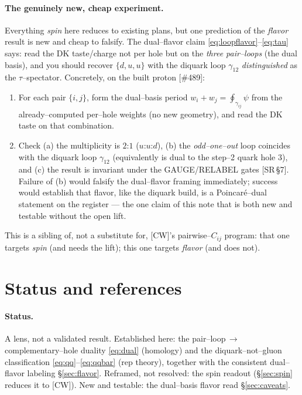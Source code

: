 \documentclass[11pt,oneside]{article}
\theoremstyle{plain}
\begin{document}
\paragraph{The genuinely new, cheap experiment.}
Everything \emph{spin} here reduces to existing plans, but one prediction of the
\emph{flavor} result is new and cheap to falsify. The dual--flavor claim
\eqref{eq:loopflavor}--\eqref{eq:tau} says: read the DK taste/charge not per hole
but on the \emph{three pair--loops} (the dual basis), and you should recover
$\{d,u,u\}$ with the diquark loop $\gamma_{12}$ \emph{distinguished} as the
$\tau$--spectator. Concretely, on the built proton [\#489]:
\begin{enumerate}[leftmargin=1.9em]
  \item For each pair $\{i,j\}$, form the dual--basis period
        $w_i+w_j=\oint_{\gamma_{ij}}\psi$ from the already--computed per--hole
        weights (no new geometry), and read the DK taste on that combination.
  \item Check (a) the multiplicity is $2$:$1$ ($u$:$u$:$d$), (b) the
        \emph{odd--one--out} loop coincides with the diquark loop $\gamma_{12}$
        (equivalently is dual to the step--2 quark hole $3$), and (c) the result is
        invariant under the GAUGE/RELABEL gates [SR\,\S7]. Failure of (b) would
        falsify the dual--flavor framing immediately; success would establish that
        flavor, like the diquark build, is a Poincar\'e--dual statement on the
        register --- the one claim of this note that is both new and testable
        without the open lift.
\end{enumerate}
This is a sibling of, not a substitute for, [CW]'s pairwise--$C_{ij}$ program: that
one targets \emph{spin} (and needs the lift); this one targets \emph{flavor} (and
does not).

\section{Status and references}
\label{sec:status}

\paragraph{Status.} A lens, not a validated result. Established here: the
pair--loop$\,\to\,$complementary--hole duality \eqref{eq:dual} (homology) and the
diquark--not--gluon classification \eqref{eq:qq}--\eqref{eq:qqbar} (rep theory),
together with the consistent dual--flavor labeling \S\ref{sec:flavor}. Reframed,
not resolved: the spin readout (\S\ref{sec:spin} reduces it to [CW]). New and
testable: the dual--basis flavor read \S\ref{sec:caveats}.
\end{document}

